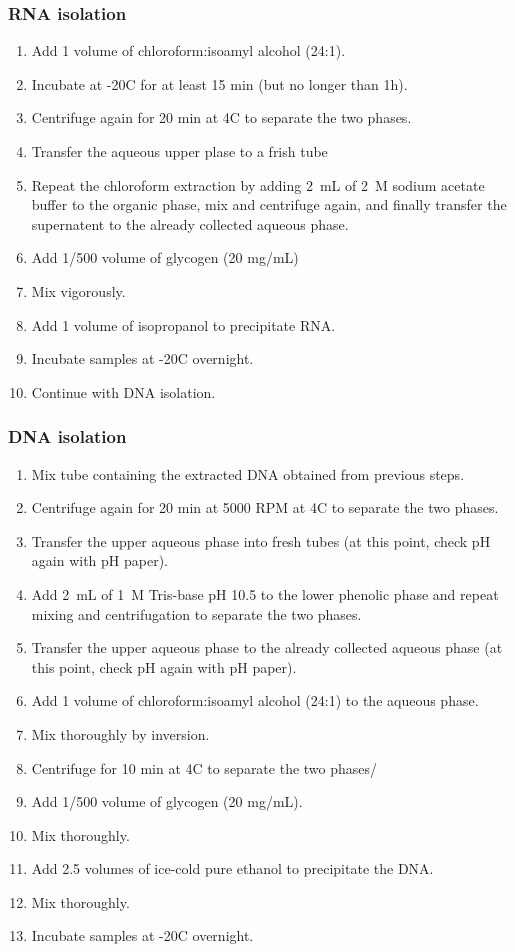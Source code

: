 \subsubsection{RNA isolation}
\begin{enumerate}
\item Add 1 volume of chloroform:isoamyl alcohol (24:1).
\item Incubate at -20\degree C for at least 15 min (but no longer than 1h).
\item Centrifuge again for 20 min at 4\degree C to separate the two phases.
\item Transfer the aqueous upper plase to a frish tube
\item Repeat the chloroform extraction by adding 2~mL of 2~M sodium acetate buffer to the organic phase, mix and centrifuge again, and finally transfer the supernatent to the already collected aqueous phase.
\item Add 1/500 volume of glycogen (20 mg/mL) 
\item Mix vigorously.
\item Add 1 volume of isopropanol to precipitate RNA.
\item Incubate samples at -20\degree C overnight. 
\item Continue with DNA isolation.
\end{enumerate}

\subsubsection{DNA isolation}
\begin{enumerate}
\item Mix tube containing the extracted DNA obtained from previous steps.
\item Centrifuge again for 20 min at 5000 RPM at 4\degree C to separate the two phases.
\item Transfer the upper aqueous phase into fresh tubes (at this point, check pH again with pH paper).
\item Add 2~mL of 1~M Tris-base pH 10.5 to the lower phenolic phase and repeat mixing and centrifugation to separate the two phases.
\item Transfer the upper aqueous phase to the already collected aqueous phase (at this point, check pH again with pH paper).
\item Add 1 volume of chloroform:isoamyl alcohol (24:1) to the aqueous phase.
\item Mix thoroughly by inversion.
\item Centrifuge for 10 min at 4\degree C to separate the two phases/
\item Add 1/500 volume of glycogen (20 mg/mL).
\item Mix thoroughly.
\item Add 2.5 volumes of ice-cold pure ethanol to precipitate the DNA.
\item Mix thoroughly.
\item Incubate samples at -20\degree C overnight.
\end{enumerate}



